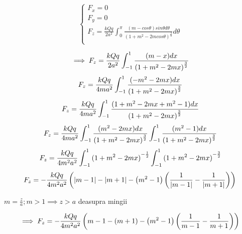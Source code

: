 \documentclass[12pt]{article}
\begin{document}
\begin{equation}
    \begin{cases}
        F_{x} = 0 \\ 
        F_{y} =  0\\ 
        F_{z} = \frac{ kQq }{ 2 a^{2} }\int_{0}^{\pi} \frac{ (m - cos\theta) sin\theta d \theta }{ {(1+m^{2} -2m cos\theta)}^{\frac{3}{2}} } d \theta\\

    \end{cases}
\end{equation}

\begin{equation}
    \implies F_{z} = \frac{ kQq }{ 2 a^{2} } \int_{-1}^{1} \frac{ (m - x) dx }{ {(1+m^{2} -2m x)}^{\frac{3}{2}} }\\
\end{equation}
\begin{equation}
    F_{z} = \frac{ kQq }{ 4m a^{2} } \int_{-1}^{1} \frac{ (-m^{2}-2mx) dx }{ {(1+m^{2} -2m x)}^{\frac{3}{2}} }\\
\end{equation}
\begin{equation}
    F_{z} = \frac{ kQq }{ 4m a^{2} } \int_{-1}^{1} \frac{ ( 1 + m^{2}-2mx+m^{2}-1 ) dx }{ {(1+m^{2} -2m x)}^{\frac{3}{2}} }\\
\end{equation}
\begin{equation}
    F_{z} = \frac{ kQq }{ 4m a^{2} } \int_{-1}^{1} \frac{ (m^{2}-2mx)dx }{ {(1+m^{2}-2mx)}^{\frac{3}{2}} } \int_{-1}^{1} \frac{ (m^{2} - 1)dx }{ {(1+m^{2}-2mx)}^{\frac{3}{2}}} \\
\end{equation}
\begin{equation}
    F_{z} = \frac{ kQq }{ 4m^{2} a^{2} } \int_{-1}^{1} {(1 + m^{2} -2mx)}^{-\frac{1}{2}} \int_{-1}^{1} {(1 + m^{2} -2mx)}^{-\frac{3}{2}} \\
\end{equation}
\begin{equation}
    F_{z} =- \frac{ kQq }{ 4m^{2} a^{2} } \left( \left| m - 1 \right| - \left| m + 1 \right| - \left( m^{2} - 1 \right) \left( \frac{1}{ \left| m - 1 \right| } - \frac{1}{ \left| m + 1 \right| } \right) \right)\\
\end{equation}

$ m=\frac{z}{a} ; m>1 \implies z > a$ deasupra mingii 

\begin{equation}
   \implies F_{z} =- \frac{ kQq }{ 4m^{2} a^{2} } \left(  m - 1  - ( m + 1)  - \left( m^{2} - 1 \right) \left( \frac{1}{  m - 1  } - \frac{1}{  m + 1  } \right) \right)\\
\end{equation}
\end{document}
